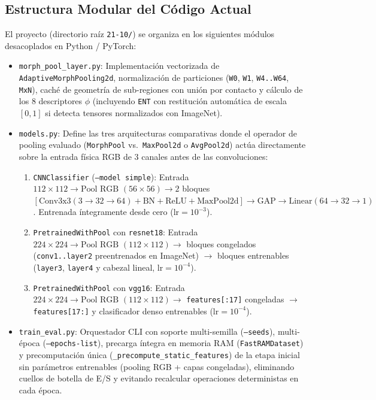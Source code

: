 \documentclass[10pt,a4paper,twocolumn]{article}
\begin{document}
\subsection{Estructura Modular del Código Actual}
El proyecto (directorio raíz \texttt{21-10/}) se organiza en los siguientes módulos desacoplados en Python / PyTorch:
\begin{itemize}[leftmargin=*,nosep]
  \item \texttt{morph\_pool\_layer.py}: Implementación vectorizada de \texttt{AdaptiveMorphPooling2d}, normalización de particiones (\texttt{W0}, \texttt{W1}, \texttt{W4..W64}, \texttt{MxN}), caché de geometría de sub-regiones con unión por contacto y cálculo de los $8$ descriptores $\phi$ (incluyendo \texttt{ENT} con restitución automática de escala $[0,1]$ si detecta tensores normalizados con ImageNet).
  \item \texttt{models.py}: Define las tres arquitecturas comparativas donde el operador de pooling evaluado (\texttt{MorphPool} vs.\ \texttt{MaxPool2d} o \texttt{AvgPool2d}) actúa directamente sobre la entrada física RGB de $3$ canales antes de las convoluciones:
    \begin{enumerate}[nosep]
      \item \texttt{CNNClassifier} (\texttt{--model simple}): Entrada $112\times112 \to \text{Pool RGB } (56\times56) \to 2$ bloques $[\text{Conv3x3}(3\to32\to64) + \text{BN} + \text{ReLU} + \text{MaxPool2d}] \to \text{GAP} \to \text{Linear}(64\to32\to1)$. Entrenada íntegramente desde cero ($\text{lr}=10^{-3}$).
      \item \texttt{PretrainedWithPool} con \texttt{resnet18}: Entrada $224\times224 \to \text{Pool RGB } (112\times112) \to$ bloques congelados (\texttt{conv1..layer2} preentrenados en ImageNet) $\to$ bloques entrenables (\texttt{layer3}, \texttt{layer4} y cabezal lineal, $\text{lr}=10^{-4}$).
      \item \texttt{PretrainedWithPool} con \texttt{vgg16}: Entrada $224\times224 \to \text{Pool RGB } (112\times112) \to$ \texttt{features[:17]} congeladas $\to$ \texttt{features[17:]} y clasificador denso entrenables ($\text{lr}=10^{-4}$).
    \end{enumerate}
  \item \texttt{train\_eval.py}: Orquestador CLI con soporte multi-semilla (\texttt{--seeds}), multi-época (\texttt{--epochs-list}), precarga íntegra en memoria RAM (\texttt{FastRAMDataset}) y precomputación única (\texttt{\_precompute\_static\_features}) de la etapa inicial sin parámetros entrenables (pooling RGB + capas congeladas), eliminando cuellos de botella de E/S y evitando recalcular operaciones deterministas en cada época.

\end{itemize}
\end{document}
